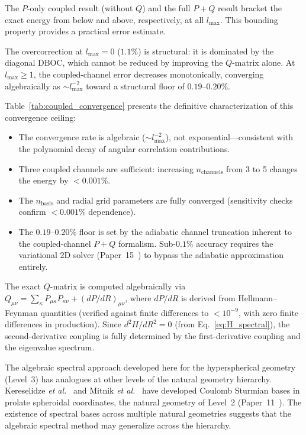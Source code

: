 \documentclass[aps,pra,twocolumn,superscriptaddress,longbibliography]{revtex4-2}
\begin{document}
The $P$-only coupled result (without $Q$) and the full $P{+}Q$
result bracket the exact energy from below and above, respectively,
at all $l_{\max}$.  This bounding property provides a practical
error estimate.

The overcorrection at $l_{\max} = 0$ ($1.1\%$) is structural:
it is dominated by the diagonal DBOC, which cannot be reduced by
improving the $Q$-matrix alone.  At $l_{\max} \ge 1$, the
coupled-channel error decreases monotonically, converging
algebraically as $\sim l_{\max}^{-2}$ toward a structural floor
of $0.19$--$0.20\%$.

Table~\ref{tab:coupled_convergence} presents the definitive
characterization of this convergence ceiling:
\begin{itemize}
  \item The convergence rate is algebraic ($\sim l_{\max}^{-2}$),
    not exponential---consistent with the polynomial decay of
    angular correlation contributions.
  \item Three coupled channels are sufficient: increasing
    $n_{\mathrm{channels}}$ from 3 to 5 changes the energy by
    $< 0.001\%$.
  \item The $n_{\mathrm{basis}}$ and radial grid parameters are
    fully converged (sensitivity checks confirm $< 0.001\%$
    dependence).
  \item The $0.19$--$0.20\%$ floor is set by the adiabatic
    channel truncation inherent to the coupled-channel $P{+}Q$
    formalism.  Sub-$0.1\%$ accuracy requires the variational
    2D solver (Paper~15~\cite{paper15}) to bypass the adiabatic
    approximation entirely.
\end{itemize}

The exact $Q$-matrix is computed algebraically via
$Q_{\mu\nu} = \sum_\kappa P_{\mu\kappa}P_{\kappa\nu}
+ (dP/dR)_{\mu\nu}$, where $dP/dR$ is derived from
Hellmann--Feynman quantities (verified against finite differences
to $< 10^{-9}$, with zero finite differences in production).
Since $d^2H/dR^2 = 0$ (from Eq.~\ref{eq:H_spectral}), the
second-derivative coupling is fully determined by the
first-derivative coupling and the eigenvalue spectrum.

The algebraic spectral approach developed here for the hyperspherical
geometry (Level~3) has analogues at other levels of the natural
geometry hierarchy.  Kereselidze \textit{et al.}~\cite{Kereselidze2016}
and Mitnik \textit{et al.}~\cite{Mitnik2021} have developed Coulomb
Sturmian bases in prolate spheroidal coordinates, the natural geometry
of Level~2 (Paper~11~\cite{loutey_paper11}).  The existence of
spectral bases across multiple natural geometries suggests that the
algebraic spectral method may generalize across the hierarchy.
\end{document}
